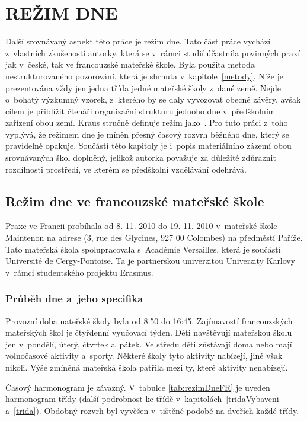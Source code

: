 \chapter{REŽIM DNE}
\label{rezim}
	Další srovnávaný aspekt této práce je režim dne. Tato část práce vychází z~vlastních zkušeností autorky, která se v~rámci studií účastnila povinných praxí jak v~české, tak ve francouzské mateřské škole. Byla použita metoda nestrukturovaného pozorování, která je shrnuta v~kapitole~\ref{metody}. Níže je prezentována vždy jen jedna třída jedné mateřské školy z~dané země. Nejde o~bohatý výzkumný vzorek, z~kterého by se daly vyvozovat obecné závěry, avšak cílem je přiblížit čtenáři organizační strukturu jednoho dne v~předškolním zařízení obou zemí. Kraus stručně definuje režim jako\textit{}~\citep[s.~700]{Kraus}.
	Pro tuto práci z~toho vyplývá, že režimem dne je míněn přesný časový rozvrh běžného dne, který se pravidelně opakuje.
	Součástí této kapitoly je i~popis materiálního zázemí obou srovnávaných škol doplněný, jelikož autorka považuje za důležité zdůraznit rozdílnosti prostředí, ve kterém se předškolní vzdělávání odehrává.
	
	\section{Režim dne ve francouzské mateřské škole}

		Praxe ve Francii probíhala od 8. 11. 2010 do 19. 11. 2010 v~mateřské škole Maintenon na adrese (3, rue des Glycines, 927 00 Colombes) na předměstí Paříže. Tato mateřská škola spolupracovala s~Académie Versailles, která je součástí Université de Cergy-Pontoise. Ta je partnerskou univerzitou Univerzity Karlovy v~rámci studentského projektu Erasmus. 


		\subsection{Průběh dne a~jeho specifika}

			Provozní doba nateřské školy byla od 8:50 do 16:45. Zajímavostí francouzských mateřských škol je čtyřdenní vyučovací týden. Děti navštěvují mateřskou školu jen v~pondělí, úterý, čtvrtek a~pátek. Ve středu děti zůstávají doma nebo mají volnočasové aktivity a~sporty. Některé školy tyto aktivity nabízejí, jiné však nikoli. Výše zmíněná mateřská škola patřila mezi ty, které aktivity nenabízejí. 
			
			Časový harmonogram je závazný. V~tabulce \ref{tab:rezimDneFR} je uveden harmonogram třídy  (další podrobnost ke třídě v~kapitolách~\ref{tridaVybaveni} a~\ref{trida}). Obdobný rozvrh byl vyvěšen v tištěné podobě na dveřích každé třídy. 

